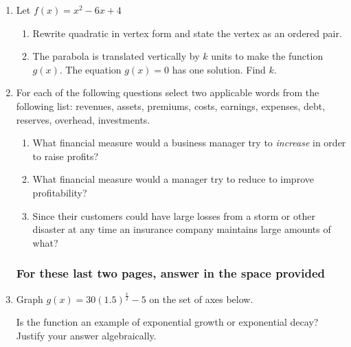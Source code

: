 \documentclass[12pt, oneside]{article}
\begin{document}
\begin{enumerate}
\item Let $f(x) = x^2-6x+4$
\begin{enumerate}
    \item Rewrite quadratic in vertex form and state the vertex as an ordered pair.
    \item The parabola is translated vertically by $k$ units to make the function $g(x)$. The equation $g(x)=0$ has one solution. Find $k$.
\end{enumerate}

\item For each of the following questions select two applicable words from the following list: revenues, assets, premiums, costs, earnings, expenses, debt, reserves, overhead, investments.
\begin{enumerate}
    \item What financial measure would a business manager try to \emph{increase} in order to raise profits?
    \item What financial measure would a manager try to reduce to improve profitability?
    \item Since their customers could have large losses from a storm or other disaster at any time an insurance company maintains large amounts of what?
\end{enumerate}

\newpage
\subsubsection*{For these last two pages, answer in the space provided}

\item Graph $g(x)=30(1.5)^{\frac{x}{2}}-5$ on the set of axes below.
\begin{center}
\end{center} %
Is the function an example of exponential growth or exponential decay? Justify your answer algebraically. 


\end{enumerate}
\end{document}
